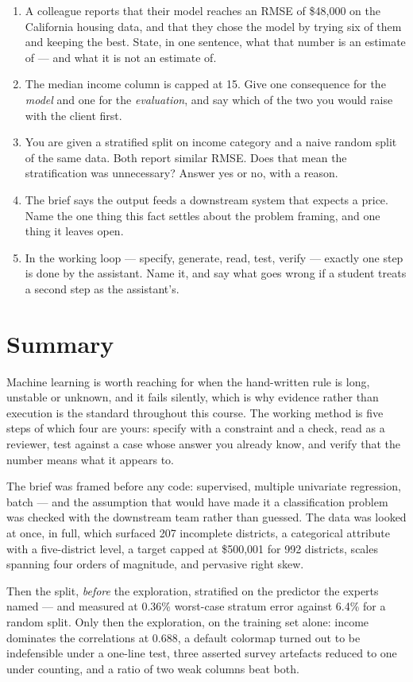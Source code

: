 \documentclass[11pt,a4paper]{article}
\begin{document}
\begin{enumerate}[leftmargin=1.6em,itemsep=4pt]
  \item A colleague reports that their model reaches an RMSE of \$48{,}000 on
        the California housing data, and that they chose the model by trying
        six of them and keeping the best. State, in one sentence, what that
        number is an estimate of --- and what it is not an estimate of. \hfill
        \scope{[4]}
  \item The median income column is capped at 15. Give one consequence for the
        \emph{model} and one for the \emph{evaluation}, and say which of the
        two you would raise with the client first. \hfill \scope{[5]}
  \item You are given a stratified split on income category and a naive random
        split of the same data. Both report similar RMSE. Does that mean the
        stratification was unnecessary? Answer yes or no, with a reason.
        \hfill \scope{[4]}
  \item The brief says the output feeds a downstream system that expects a
        price. Name the one thing this fact settles about the problem framing,
        and one thing it leaves open. \hfill \scope{[4]}
  \item In the working loop --- specify, generate, read, test, verify ---
        exactly one step is done by the assistant. Name it, and say what goes
        wrong if a student treats a second step as the assistant's. \hfill
        \scope{[3]}
\end{enumerate}

\section*{Summary}

Machine learning is worth reaching for when the hand-written rule is long,
unstable or unknown, and it fails silently, which is why evidence rather than
execution is the standard throughout this course. The working method is five
steps of which four are yours: specify with a constraint and a check, read as a
reviewer, test against a case whose answer you already know, and verify that
the number means what it appears to.

The brief was framed before any code: supervised, multiple univariate
regression, batch --- and the assumption that would have made it a
classification problem was checked with the downstream team rather than
guessed. The data was looked at once, in full, which surfaced 207 incomplete
districts, a categorical attribute with a five-district level, a target capped
at \$500{,}001 for 992 districts, scales spanning four orders of magnitude, and
pervasive right skew.

Then the split, \emph{before} the exploration, stratified on the predictor the
experts named --- and measured at 0.36\% worst-case stratum error against
6.4\% for a random split. Only then the exploration, on the training set alone:
income dominates the correlations at 0.688, a default colormap turned out to be
indefensible under a one-line test, three asserted survey artefacts reduced to
one under counting, and a ratio of two weak columns beat both.
\end{document}
